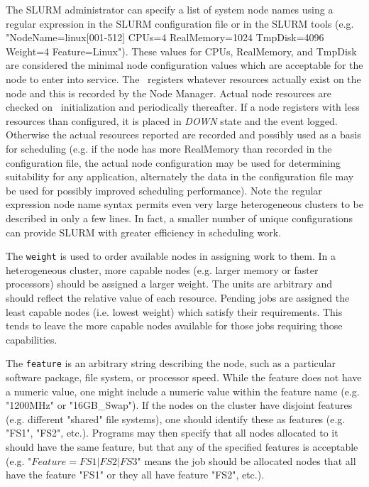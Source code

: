 The SLURM administrator can specify a list of system node
names using a regular expression in the SLURM configuration file 
or in the SLURM tools (e.g. "NodeName=linux[001-512] CPUs=4
RealMemory=1024 TmpDisk=4096 Weight=4 Feature=Linux").  These values
for CPUs, RealMemory, and TmpDisk are considered the minimal
node configuration values which are acceptable for the node to enter
into service.  The \slurmd\ registers whatever resources actually
exist on the node and this is recorded by the Node Manager.
Actual node resources are checked on \slurmd\ initialization and
periodically thereafter.  
If a node registers with less resources than configured, it
is placed in {\em DOWN} state and the event logged.  Otherwise the
actual resources reported are recorded and possibly used as a basis 
for scheduling (e.g. if the node has more RealMemory than recorded in 
the configuration file, the actual node configuration may be used for 
determining suitability for any application, alternately the data in 
the configuration file may be used for possibly improved scheduling performance).
Note the regular expression node name syntax permits even very large
heterogeneous clusters to be described in only a few lines.  In fact,
a smaller number of unique configurations can provide SLURM with greater
efficiency in scheduling work.

The {\tt weight} is used to order available nodes in assigning work to them.
In a heterogeneous cluster, more capable nodes (e.g. larger memory
or faster processors) should be assigned a larger weight.  The units
are arbitrary and should reflect the relative value of each resource.
Pending jobs are assigned the least capable nodes (i.e. lowest
weight) which satisfy their requirements.  This tends to leave the
more capable nodes available for those jobs requiring those capabilities.

The {\tt feature} is an arbitrary string describing the node, such as
a particular software package, file system, or processor speed.
While the feature does not have a numeric value, one might include a
numeric value within the feature name (e.g. "1200MHz" or "16GB\_Swap").
If the nodes on the cluster have disjoint features (e.g. different
"shared" file systems), one should identify these as features (e.g. "FS1",
"FS2", etc.).  Programs may then specify that all nodes allocated to it
should have the same feature, but that any of the specified features is
acceptable (e.g. "$Feature=FS1|FS2|FS3$" means the job should be allocated 
nodes that all have the feature "FS1" or they all have feature "FS2", etc.).


